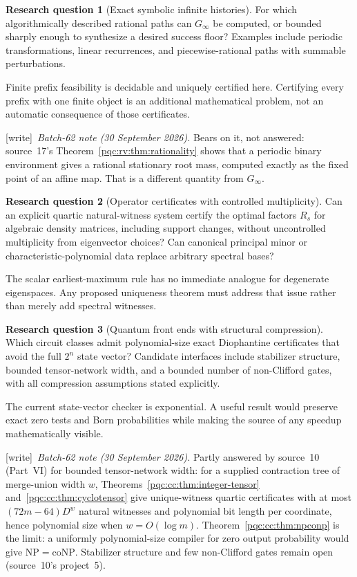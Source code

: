 \documentclass[11pt,letterpaper]{article}
\numberwithin{equation}{section}
\theoremstyle{definition}
\newtheorem{question}{Research question}
\theoremstyle{remark}
\newcommand{\wtag}{\textup{[write]}}
\begin{document}
\begin{question}[Exact symbolic infinite histories]\label{pqc:q:histories}
For which algorithmically described rational paths can $G_\infty$ be
computed, or bounded sharply enough to synthesize a desired success floor?
Examples include periodic transformations, linear recurrences, and
piecewise-rational paths with summable perturbations.
\end{question}
Finite prefix feasibility is decidable and uniquely certified here.
Certifying every prefix with one finite object is an additional mathematical
problem, not an automatic consequence of those certificates.
\par\noindent\wtag\ \emph{Batch-62 note (30 September 2026).} Bears on it, not answered: source~17's Theorem~\ref{pqc:rv:thm:rationality}
shows that a periodic binary environment gives a rational stationary root mass,
computed exactly as the fixed point of an affine map. That is a different
quantity from $G_\infty$.

\begin{question}[Operator certificates with controlled multiplicity]\label{pqc:q:operator}
Can an explicit quartic natural-witness system certify the optimal factors
$R_s$ for algebraic density matrices, including support changes, without
uncontrolled multiplicity from eigenvector choices? Can canonical principal
minor or characteristic-polynomial data replace arbitrary spectral bases?
\end{question}
The scalar earliest-maximum rule has no immediate analogue for degenerate
eigenspaces. Any proposed uniqueness theorem must address that issue rather
than merely add spectral witnesses.

\begin{question}[Quantum front ends with structural compression]\label{pqc:q:frontend}
Which circuit classes admit polynomial-size exact Diophantine certificates
that avoid the full $2^n$ state vector? Candidate interfaces include
stabilizer structure, bounded tensor-network width, and a bounded number of
non-Clifford gates, with all compression assumptions stated explicitly.
\end{question}
The current state-vector checker is exponential. A useful result would
preserve exact zero tests and Born probabilities while making the source of
any speedup mathematically visible.
\par\noindent\wtag\ \emph{Batch-62 note (30 September 2026).} Partly answered by source~10 (Part~VI) for bounded tensor-network width: for
a supplied contraction tree of merge-union width $w$,
Theorems~\ref{pqc:cc:thm:integer-tensor} and~\ref{pqc:cc:thm:cyclotensor} give
unique-witness quartic certificates with at most $(72m-64)D^w$ natural
witnesses and polynomial bit length per coordinate, hence polynomial size when
$w=O(\log m)$. Theorem~\ref{pqc:cc:thm:npconp} is the limit: a uniformly
polynomial-size compiler for zero output probability would give
$\mathrm{NP}=\mathrm{coNP}$. Stabilizer structure and few non-Clifford gates
remain open (source~10's project~5).
\end{document}

